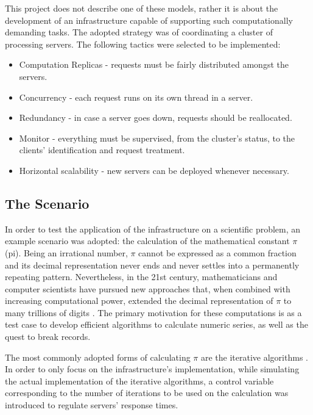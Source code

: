 \documentclass[12pt]{article}
\begin{document}
This project does not describe one of these models, rather it is about the development of an infrastructure capable of supporting such computationally demanding tasks.
The adopted strategy was of coordinating a cluster of processing servers.
The following tactics were selected to be implemented:
\vspace{-10pt}
\begin{itemize}[noitemsep]
  \item Computation Replicas - requests must be fairly distributed amongst the servers.
  \item Concurrency - each request runs on its own thread in a server.
  \item Redundancy - in case a server goes down, requests should be reallocated.
  \item Monitor - everything must be supervised, from the cluster's status, to the clients' identification and request treatment.
  \item Horizontal scalability - new servers can be deployed whenever necessary.
\end{itemize}
\vspace{-10pt}

\subsection{The Scenario} \label{scenario} %

In order to test the application of the infrastructure on a scientific problem, an example scenario was adopted: the calculation of the mathematical constant $\pi$ (pi).
Being an irrational number, $\pi$ cannot be expressed as a common fraction and its decimal representation never ends and never settles into a permanently repeating pattern.
Nevertheless, in the 21st century, mathematicians and computer scientists have pursued new approaches that, when combined with increasing computational power,
extended the decimal representation of $\pi$ to many trillions of digits \cite{pisky}.
The primary motivation for these computations is as a test case to develop efficient algorithms to calculate numeric series, as well as the quest to break records.

The most commonly adopted forms of calculating $\pi$ are the iterative algorithms \cite{jorg}.
In order to only focus on the infrastructure's implementation, while simulating the actual implementation of the iterative algorithms, a control variable
corresponding to the number of iterations to be used on the calculation was introduced to regulate servers' response times.
\end{document}
